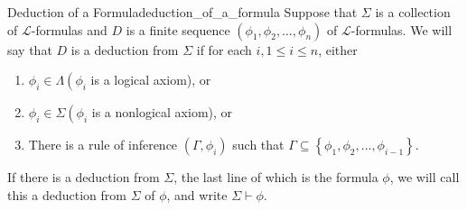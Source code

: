 \begin{definition}{Deduction of a Formula}{deduction_of_a_formula}
Suppose that $\Sigma$ is a collection of $\mathcal{L}$-formulas and $D$ is a finite sequence $\left(\phi_{1}, \phi_{2}, \ldots, \phi_{n}\right)$ of $\mathcal{L}$-formulas. We will say that $D$ is a deduction from $\Sigma$ if for each $i, 1 \leq i \leq n$, either
\begin{enumerate}
    \item $\phi_{i} \in \Lambda\left(\phi_{i}\right.$ is a logical axiom), or
    \item $\phi_{i} \in \Sigma\left(\phi_{i}\right.$ is a nonlogical axiom), or
    \item There is a rule of inference $\left(\Gamma, \phi_{i}\right)$ such that $\Gamma \subseteq\left\{\phi_{1}, \phi_{2}, \ldots, \phi_{i-1}\right\}$.
\end{enumerate}
If there is a deduction from $\Sigma$, the last line of which is the formula $\phi$, we will call this a deduction from $\Sigma$ of $\phi$, and write $\Sigma \vdash \phi$.
\end{definition}
